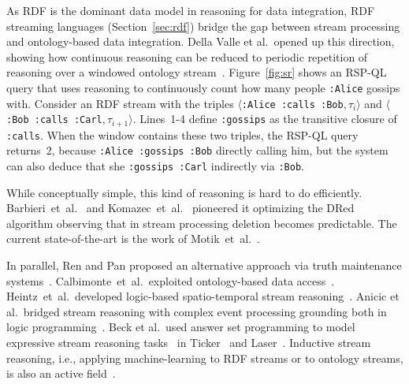 As RDF is the dominant data model in reasoning for data integration,
RDF streaming languages (Section~\ref{sec:rdf}) bridge the gap between
stream processing and ontology-based data integration.  Della Valle et
al.\ opened up this direction, showing how continuous
reasoning can be reduced to periodic repetition of
reasoning over a windowed ontology
stream~\cite{DBLP:conf/fis/ValleCBBC08}.  Figure~\ref{fig:sr} shows an
RSP-QL query that uses reasoning to continuously count how many people
\lstinline{:Alice} gossips with. Consider an RDF stream with the
triples \mbox{$\langle$\lstinline{:Alice :calls :Bob}$,\tau_i\rangle$}
and \mbox{$\langle$\lstinline{:Bob :calls :Carl}$,\tau_{i+1}\rangle$}.
\mbox{Lines 1-4} define \lstinline{:gossips} as the transitive closure
of \lstinline{:calls}. When the window contains these two triples, the
RSP-QL query returns~2, because \lstinline{:Alice :gossips :Bob}
directly calling him, but the system can also deduce that she
\lstinline{:gossips :Carl} indirectly via \lstinline{:Bob}.

While conceptually simple, this kind of reasoning is hard to do
efficiently. Barbieri~et~al.~\cite{DBLP:conf/esws/BarbieriBCVG10} and Komazec~et~al.~\cite{DBLP:conf/debs/KomazecCF12} pioneered it optimizing the DRed algorithm observing that in stream processing
deletion becomes predictable. The current state-of-the-art is the
work of Motik~et~al.~\cite{DBLP:conf/aaai/MotikNPH15a}. 

In parallel, Ren and Pan
proposed an alternative approach via truth maintenance
systems~\cite{Ren2011}. Calbimonte~et~al.\ exploited ontology-based data access~\cite{DBLP:conf/esws/CalbimonteMC16}.
Heintz~et~al.\ developed logic-based spatio-temporal stream
reasoning~\cite{DeLengHeintz2016AAAI}.  Anicic
et al.\ bridged stream reasoning with complex event processing
grounding both in logic
programming~\cite{DBLP:journals/semweb/AnicicRFS12}. Beck et al.\ used
answer set programming to model expressive stream reasoning
tasks~\cite{DBLP:conf/aaai/BeckDEF15} in
Ticker~\cite{DBLP:journals/tplp/BeckEB17} and
Laser~\cite{DBLP:conf/semweb/BazoobandiBU17}.  Inductive stream
reasoning, i.e., applying machine-learning to RDF streams
or to ontology streams, is also an active
field~\cite{DBLP:journals/expert/BarbieriBCVHTRW10,DBLP:conf/ijcai/ChenLPC17,DBLP:conf/ijcai/LecueP13}.
